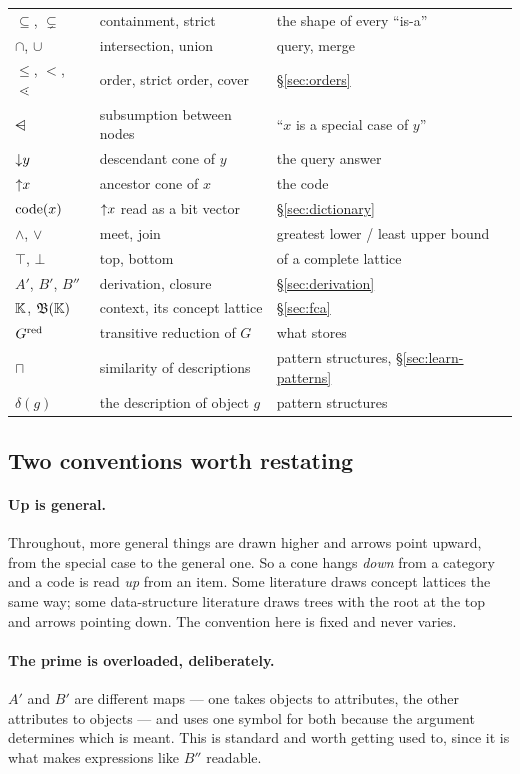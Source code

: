 \begin{center}\small
\begin{tabularx}{0.93\textwidth}{@{}ll X@{}}
\toprule
$\subseteq$, $\subsetneq$ & containment, strict & the shape of every ``is-a''\\
$\cap$, $\cup$ & intersection, union & query, merge\\
$\leq$, $<$, $\lessdot$ & order, strict order, cover & \S\ref{sec:orders}\\
$\dsub$ & subsumption between nodes & ``$x$ is a special case of $y$''\\
$\mathord{\downarrow}y$ & descendant cone of $y$ & the query answer\\
$\mathord{\uparrow}x$ & ancestor cone of $x$ & the code\\
$\mathrm{code}(x)$ & $\mathord{\uparrow}x$ read as a bit vector & \S\ref{sec:dictionary}\\
$\wedge$, $\vee$ & meet, join & greatest lower / least upper bound\\
$\top$, $\bot$ & top, bottom & of a complete lattice\\
$A'$, $B'$, $B''$ & derivation, closure & \S\ref{sec:derivation}\\
$\mathbb{K}$, $\mathfrak{B}(\mathbb{K})$ & context, its concept lattice & \S\ref{sec:fca}\\
$G^{\mathrm{red}}$ & transitive reduction of $G$ & what \odag{} stores\\
$\sqcap$ & similarity of descriptions & pattern structures,
  \S\ref{sec:learn-patterns}\\
$\delta(g)$ & the description of object $g$ & pattern structures\\
\bottomrule
\end{tabularx}
\end{center}

\subsection*{Two conventions worth restating}

\paragraph{Up is general.} Throughout, more general things are drawn higher
and arrows point upward, from the special case to the general one. So a cone
hangs \emph{down} from a category and a code is read \emph{up} from an item.
Some \fca{} literature draws concept lattices the same way; some data-structure
literature draws trees with the root at the top and arrows pointing down. The
convention here is fixed and never varies.

\paragraph{The prime is overloaded, deliberately.} $A'$ and $B'$ are different
maps --- one takes objects to attributes, the other attributes to objects ---
and \fca{} uses one symbol for both because the argument determines which is
meant. This is standard and worth getting used to, since it is what makes
expressions like $B''$ readable.
